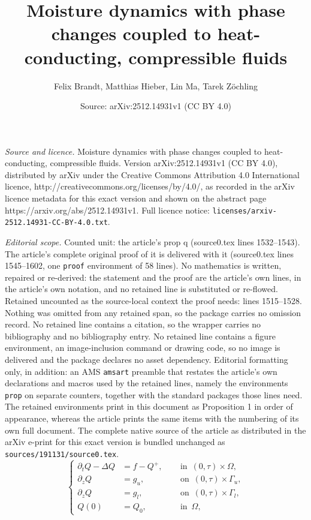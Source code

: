 \documentclass[10pt,a4paper]{amsart}
\title{Moisture dynamics with phase changes coupled to heat-conducting, compressible fluids}
\author{Felix Brandt, Matthias Hieber, Lin Ma, Tarek Z\"ochling}
\date{Source: arXiv:2512.14931v1 (CC BY 4.0)}
\newcommand{\Gal}{\Gamma_l}
\newcommand{\Gau}{\Gamma_u}
\newcommand{\del}{\partial}
\newcommand{\dt}{\del_t}
\newcommand{\dz}{\del_z}
\newcommand{\tin}{\enspace \text{in} \enspace}
\newcommand{\ton}{\enspace \text{on} \enspace}
\begin{document}
\maketitle

\noindent\emph{Source and licence.} Moisture dynamics with phase changes coupled to heat-conducting, compressible fluids. Version arXiv:2512.14931v1 (CC BY 4.0), distributed by arXiv under the Creative Commons Attribution 4.0 International licence, http://creativecommons.org/licenses/by/4.0/, as recorded in the arXiv licence metadata for this exact version and shown on the abstract page https://arxiv.org/abs/2512.14931v1. Full licence notice: \texttt{licenses/arxiv-2512.14931-CC-BY-4.0.txt}.\par\smallskip

\noindent\textit{Editorial scope.} Counted unit: the article's prop q (source0.tex lines 1532--1543). The article's complete original proof of it is delivered with it (source0.tex lines 1545--1602, one \texttt{proof} environment of 58 lines). No mathematics is written, repaired or re-derived: the statement and the proof are the article's own lines, in the article's own notation, and no retained line is substituted or re-flowed.  Retained uncounted as the source-local context the proof needs: lines 1515--1528.  Nothing was omitted from any retained span, so the package carries no omission record.  No retained line contains a citation, so the wrapper carries no bibliography and no bibliography entry.  No retained line contains a figure environment, an image-inclusion command or drawing code, so no image is delivered and the package declares no asset dependency.  Editorial formatting only, in addition: an AMS \texttt{amsart} preamble that restates the article's own declarations and macros used by the retained lines, namely the environments \texttt{prop} on separate counters, together with the standard packages those lines need.  The retained environments print in this document as Proposition 1 in order of appearance, whereas the article prints the same items with the numbering of its own full document.  The complete native source of the article as distributed in the arXiv e-print for this exact version is bundled unchanged as \texttt{sources/191131/source0.tex}.
\begin{equation}\label{eq: auxillary for q}
    \left\{
    \begin{aligned}
        \dt Q - \Delta Q
        &= f -Q^+, &&\tin (0,\tau) \times \Omega,\\
        \dz Q
        &= g_u, &&\ton (0,\tau) \times \Gau,\\
       \dz Q
        &= g_l, &&\ton (0,\tau) \times \Gal,\\
        Q(0)
        &= Q_0, &&\tin \Omega,
    \end{aligned}
    \right.
\end{equation}
\end{document}
